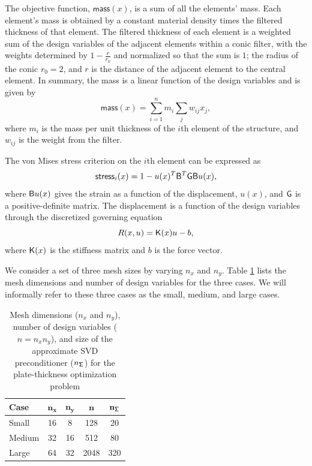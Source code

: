 The objective function, $\textsf{mass}(x)$, is a sum of all the elements' mass. 
Each element's mass is obtained by a constant material density times the filtered thickness of that element. 
The filtered thickness of each element is a weighted sum of the design variables 
of the adjacent elements within a conic filter, with the weights determined by 
$1-\frac{r}{r_0}$ and normalized so that the sum is $1$;   the radius of the conic $r_0=2$, and $r$ is the distance 
of the adjacent element to the central element.  In summary, the mass is a linear function
of the design variables and is given by
\begin{equation*}
  \textsf{mass}(x) = \sum_{i=1}^{n} m_{i} \sum_{j} w_{ij} x_j,     %
\end{equation*}
where $m_i$ is the mass per unit thickness of the $i$th element of the
structure, and $w_{ij}$ is the weight from the filter. 


The von Mises stress
criterion on the $i$th element can be expressed as
\begin{equation*}
  \textsf{stress}_i(x) = 1 - u(x)^T \mathsf{B}^T \mathsf{G} \mathsf{B} u(x),
\end{equation*}
where $\mathsf{B} u(x)$ gives the strain as a function of the displacement,
$u(x)$, and $\mathsf{G}$ is a positive-definite matrix.  The displacement is a
function of the design variables through the discretized governing equation
\begin{equation*}
  R(x,u) = \mathsf{K}(x) u - b,
\end{equation*}
where $\mathsf{K}(x)$ is the stiffness matrix and $b$ is the force vector.

We consider a set of three mesh sizes by varying $n_x$ and $n_y$.  Table
\ref{tab:mesh_sizes} lists the mesh dimensions and number of design variables
for the three cases. We will informally refer to these three cases as the small, medium, and large
cases.

\begin{table}[tbp]
  \begin{center}
    \caption{Mesh dimensions ($n_x$ and $n_y$), number of design variables ($n =
      n_x n_y$), and size of the approximate SVD preconditioner
      ($n_{\mathsf{\Sigma}}$) for the plate-thickness optimization
      problem \label{tab:mesh_sizes}}
  \begin{tabular}{ l c c c c}
    \textbf{Case} & $\mathbf{n_x}$  & $\mathbf{n_y}$ & $\mathbf{n}$
    & $\mathbf{{n_{\mathsf{\Sigma}}}}$
    \\ \hline
    \rule{0ex}{3ex}%
    Small  &   16 & 8  & 128  & 20 \\ 
    Medium &   32 & 16 & 512  & 80 \\  
    Large  &   64 & 32 & 2048 & 320  
  \end{tabular}
  \end{center}
\end{table}

